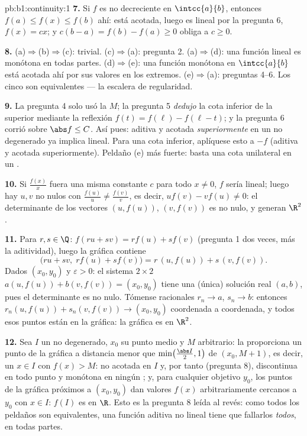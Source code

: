 \begin{solution}{pb:b1:continuity:1}
\textbf{7.} Si $f$ es no decreciente en $\intcc{a}{b}$, entonces
$f(a) \leq f(x) \leq f(b)$ ahí: está acotada, luego es lineal por la
pregunta 6, $f(x) = cx$; y $c(b - a) = f(b) - f(a) \geq 0$ obliga a
$c \geq 0$.

\textbf{8.} (a)$\Rightarrow$(b)$\Rightarrow$(c): trivial.
(c)$\Rightarrow$(a): pregunta 2. (a)$\Rightarrow$(d): una función
lineal es monótona en todas partes. (d)$\Rightarrow$(e): una función
monótona en $\intcc{a}{b}$ está acotada ahí por sus valores en los
extremos. (e)$\Rightarrow$(a): preguntas 4--6. Los cinco
 son equivalentes --- la escalera de regularidad.

\textbf{9.} La pregunta 4 solo usó la  $M$; la
pregunta 5 \emph{dedujo} la cota inferior de la superior mediante la
reflexión $f(t) = f(\ell) - f(\ell - t)$; y la pregunta 6 corrió
sobre $\abs f \leq C$. Así pues: aditiva y acotada
\emph{superiormente} en un  no degenerado ya implica lineal.
Para una cota inferior, aplíquese esto a $-f$ (aditiva y acotada
superiormente). Peldaño (e) más fuerte: basta una cota unilateral en
un .

\textbf{10.} Si $\frac{f(x)}{x}$ fuera una misma constante $c$ para
todo $x \neq 0$, $f$ sería lineal; luego hay $u, v$ no nulos con
$\frac{f(u)}u \neq \frac{f(v)}v$, es decir,
$u f(v) - v f(u) \neq 0$: el determinante de los vectores
$(u, f(u))$, $(v, f(v))$ es no nulo, y generan $\R^2$.

\textbf{11.} Para $r, s \in \Q$: $f(ru + sv) = r f(u) + s f(v)$
(pregunta 1 dos veces, más la aditividad), luego la gráfica contiene
\[
\bigl(ru + sv,\; r f(u) + s f(v)\bigr)
= r\,(u, f(u)) + s\,(v, f(v)) .
\]
Dados $(x_0, y_0)$ y $\varepsilon > 0$: el sistema $2 \times 2$
$a(u, f(u)) + b(v, f(v)) = (x_0, y_0)$ tiene una (única) solución
real $(a, b)$, pues el determinante es no nulo. Tómense racionales
$r_n \to a$, $s_n \to b$: entonces
$r_n(u, f(u)) + s_n(v, f(v)) \to (x_0, y_0)$ coordenada a coordenada,
y todos esos puntos están en la gráfica: la gráfica es  en $\R^2$.

\textbf{12.} Sea $I$ un  no degenerado, $x_0$ su punto
medio y $M$ arbitrario: la  proporciona un punto de la gráfica
a distancia menor que $\min\bigl(\frac{\abs I}{2}, 1\bigr)$ de
$(x_0, M + 1)$, es decir, un $x \in I$ con $f(x) > M$: no acotada en
$I$ y, por tanto (pregunta 8), discontinua en todo punto y monótona
en ningún ; y, para cualquier objetivo $y_0$, los puntos de
la gráfica próximos a $(x_0, y_0)$ dan valores $f(x)$ arbitrariamente
cercanos a $y_0$ con $x \in I$: $f(I)$ es  en $\R$. Esto es la
pregunta 8 leída al revés: como todos los peldaños son equivalentes,
una función aditiva no lineal tiene que fallarlos \emph{todos}, en
todas partes.


\end{solution}
